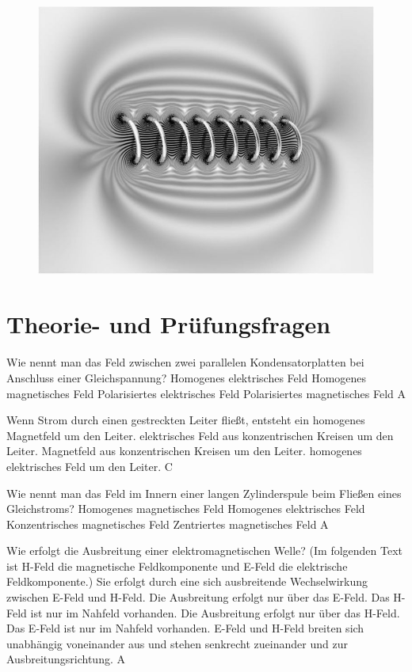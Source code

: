 \begin{figure}
 \vspace{-6cm}
 \includegraphics[scale=0.25]{elektromagnetisch/Bilder/750px-Solenoid-6.jpg}
 \vspace{-6cm}
\end{figure}

\section*{Theorie- und Prüfungsfragen} 

{Wie nennt man das Feld zwischen zwei parallelen Kondensatorplatten bei Anschluss einer Gleichspannung?}%
{Homogenes elektrisches Feld}%
{Homogenes magnetisches Feld}%
{Polarisiertes elektrisches Feld}%
{Polarisiertes magnetisches Feld}%
{A}%

{Wenn Strom durch einen gestreckten Leiter fließt, entsteht ein}%
{homogenes Magnetfeld um den Leiter.}%
{elektrisches Feld aus konzentrischen Kreisen um den Leiter.}%
{Magnetfeld aus konzentrischen Kreisen um den Leiter.}%
{homogenes elektrisches Feld um den Leiter.}%
{C}%

{Wie nennt man das Feld im Innern einer langen Zylinderspule beim Fließen eines Gleichstroms?}
{Homogenes magnetisches Feld}%
{Homogenes elektrisches Feld}%
{Konzentrisches magnetisches Feld}%
{Zentriertes magnetisches Feld}%
{A}%


{Wie erfolgt die Ausbreitung einer elektromagnetischen Welle? (Im folgenden Text ist H-Feld die magnetische Feldkomponente und E-Feld die elektrische Feldkomponente.)}%
{Sie erfolgt durch eine sich ausbreitende Wechselwirkung zwischen E-Feld und H-Feld.}%
{Die Ausbreitung erfolgt nur über das E-Feld. Das H-Feld ist nur im Nahfeld vorhanden.}%
{Die Ausbreitung erfolgt nur über das H-Feld. Das E-Feld ist nur im Nahfeld vorhanden.}%
{E-Feld und H-Feld breiten sich unabhängig voneinander aus und stehen senkrecht zueinander und zur Ausbreitungsrichtung.}%
{A}%


